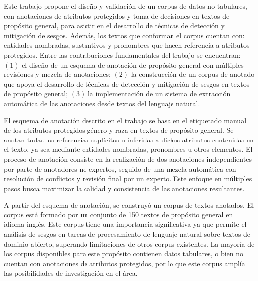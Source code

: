 \begin{conclusions}
    Este trabajo propone el dise\~no y validaci\'on de un corpus de datos no tabulares, con anotaciones de atributos
    protegidos y toma de decisiones en textos de prop\'osito general, para asistir en el desarrollo de t\'ecnicas de 
    detecci\'on y mitigaci\'on de sesgos. Adem\'as, los textos que conforman el corpus cuentan con: 
    entidades nombradas, sustantivos y pronombres que hacen referencia a atributos protegidos.
    Entre las contribuciones fundamentales del trabajo se encuentran: $(1)$ el 
    dise\~no de un esquema de anotaci\'on de prop\'osito general con m\'ultiples revisiones y mezcla de anotaciones;
    $(2)$ la construcci\'on de un corpus de anotado que apoya el desarrollo de t\'ecnicas de detecci\'on y mitigaci\'on
    de sesgos en textos de prop\'osito general; $(3)$ la implementaci\'on de un sistema de extracci\'on autom\'atica 
    de las anotaciones desde textos del lenguaje natural.

    El esquema de anotaci\'on descrito en el trabajo se basa en el etiquetado manual de los atributos protegidos g\'enero 
    y raza en textos de prop\'osito general. Se anotan todas las referencias expl\'icitas o inferidas a dichos 
    atributos contenidas en el texto, ya sea mediante entidades nombradas, pronombres u otros elementos. El proceso
    de anotaci\'on consiste en la realizaci\'on de dos anotaciones independientes por parte de anotadores no expertos,
    seguido de una mezcla autom\'atica con resoluci\'on de conflictos y revisi\'on final por un experto. Este enfoque en m\'ultiples 
    pasos busca maximizar la calidad y consistencia de las anotaciones resultantes.

    A partir del esquema de anotaci\'on, se construy\'o un corpus de textos anotados. El corpus est\'a formado por un 
    conjunto de 150 textos de prop\'osito general en idioma ingl\'es. Este corpus tiene una importancia significativa
    ya que permite el an\'alisis de sesgos en tareas de procesamiento de lenguaje natural sobre textos de dominio abierto, 
    superando limitaciones de otros corpus existentes. La mayor\'ia de los corpus disponibles para este prop\'osito
    contienen datos tabulares, o bien no cuentan con anotaciones de atributos protegidos, por lo que este corpus 
    ampl\'ia las posibilidades de investigaci\'on en el \'area.
    

\end{conclusions}

